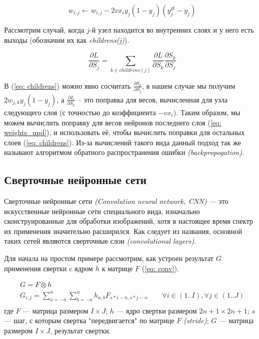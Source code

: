 \begin{equation}\label{eq: weights_upd}
    w_{i, j} \leftarrow w_{i, j} - 2 v x_i y_j (1 - y_j) (y^{gt}_j - y_j)
\end{equation}

Рассмотрим случай, когда $j$-й узел находится во внутренних слоях и 
у него есть выходы (обозначим их как \textit{childrens(j)}).

\begin{equation}\label{eq: childrens}
    \frac{\partial L}{\partial S_j} = 
    \sum_{k \in childrens(j)} \frac{\partial L}{\partial S_k} \frac{\partial S_k}{\partial S_j} 
\end{equation}


\indent
\indent
В (\ref{eq: childrens}) можно явно сосчитать 
$\frac{\partial S_k}{\partial S_j}$, в нашем случае мы получим 
$2 w_{j, k} y_j (1 - y_j)$, а $\frac{\partial L}{\partial S_k}$ -- это поправка для весов, вычисленная для узла 
следующего слоя (с точностью до коэффициента $-v x_i$). Таким образом, мы можем вычислить
поправку для весов нейронов последнего слоя (\ref{eq: weights_upd}), и использовать
её, чтобы вычислить поправки для остальных слоев
(\ref{eq: childrens}). Из-за вычислений такого вида
 данный подход так же называют алгоритмом обратного распространения ошибки \textit{(backpropogation)}.
 

\subsection{Сверточные нейронные сети}

\indent
\indent
Сверточные нейронные сети \textit{(Convolution neural network, CNN)} --- 
это искусственные нейронные сети специального вида,
изначально сконструированные для 
обработки изображений, хотя в настоящее время спектр их применения 
значительно расширился. Как следует из названия, основной таких сетей 
являются сверточные слои \textit{(convolutional layers)}.

\indent
\indent
 Для начала на простом примере рассмотрим,
 как устроен результат $G$ применения свертки c ядром $h$ 
 к матрице  $F$ (\ref{eq: conv}). 

\begin{equation}\label{eq: conv}
    \begin{gathered}
        G = F \otimes h \\
	    G_{i, j} = \sum_{a=-n}^{n} \sum_{b=-n}^{n} h_{a, b} F_{s*i - n, s*j - n} \qquad
	    \forall i \in (1..I), \forall j \in (1..J) \\
    \end{gathered}
\end{equation}
где $F$ --- матрица размером $I \times J$;
$h$ --- ядро свертки размером $2n+1 \times 2n+1$;
$s$ --- шаг, с которым свертка "передвигается" по матрице $F$ \textit{(stride)};
$G$ --- матрица размером $I \times J$, результат свертки.

